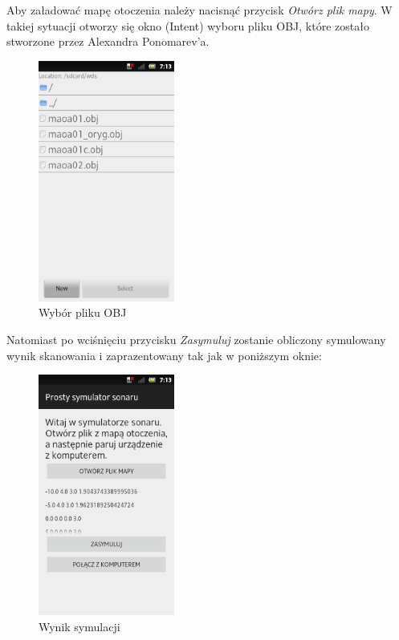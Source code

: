 \documentclass[a4paper,12pt]{article}
\begin{document}
Aby załadować mapę otoczenia należy nacisnąć przycisk \textit{Otwórz plik mapy}. W takiej sytuacji otworzy się okno (Intent) wyboru pliku OBJ, które zostało stworzone przez Alexandra Ponomarev'a. 
\begin{figure} [H]
\centering
\includegraphics[height=300px]{s3.png}
\caption{Wybór pliku OBJ}
\label{s3}
\end{figure}
Natomiast po wciśnięciu przycisku \textit{Zasymuluj} zostanie obliczony symulowany wynik skanowania i zaprazentowany tak jak w poniższym oknie:
\begin{figure} [H]
\centering
\includegraphics[height=300px]{s5.png}
\caption{Wynik symulacji}
\label{s5}
\end{figure}
\end{document}
